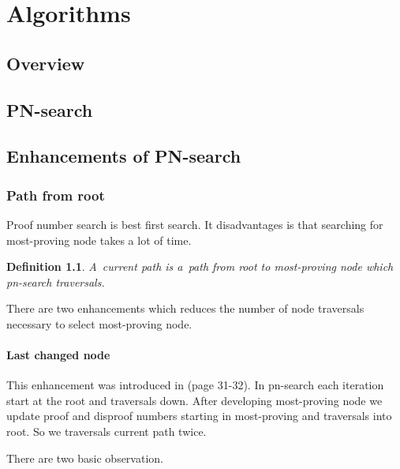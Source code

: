 \chapter{Algorithms}

\section{Overview}

\section{PN-search}


\section{Enhancements of PN-search}

\subsection{Path from root}

Proof number search is best first search. It disadvantages is that searching for most-proving node takes
a lot of time. 

\newtheorem*{currentPath}{Definition}	
\begin{currentPath}
A~{\sl current path} is a~path from root to most-proving node which pn-search traversals.
\end{currentPath}

There are two enhancements which reduces the number of node traversals necessary to select
most-proving node. 

\subsubsection{Last changed node}

This enhancement was introduced in \cite{allis} (page 31-32).
In pn-search each iteration start at the root and traversals down. After developing
most-proving node we update proof and disproof numbers starting in most-proving and 
traversals into root. 
So we traversals current path twice. 

There are two basic observation.

